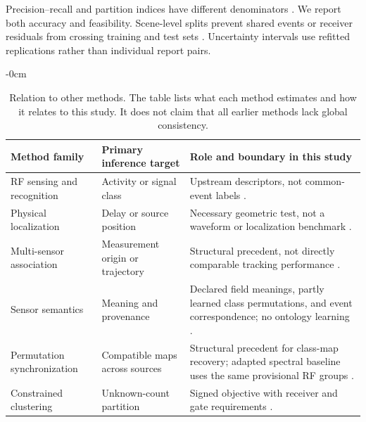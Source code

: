 Precision--recall and partition indices have different denominators \cite{miller2024,hassan2024}. We report both accuracy and feasibility. Scene-level splits prevent shared events or receiver residuals from crossing training and test sets \cite{kapoor}. Uncertainty intervals use refitted replications rather than individual report pairs.
\begin{table}[!t]\begin{adjustwidth}{-\extralength}{0cm}
\caption{Relation to other methods. The table lists what each method estimates and how it relates to this study. It does not claim that all earlier methods lack global consistency.}\label{tab:positioning}
\small\setlength{\tabcolsep}{5pt}\renewcommand{\arraystretch}{1.16}
\begin{tabularx}{\linewidth}{@{}p{3.8cm}p{4.05cm}Y@{}}\toprule
Method family & Primary inference target & Role and boundary in this study\\\midrule
RF sensing and recognition & Activity or signal class & Upstream descriptors, not common-event labels \cite{syed2023,zhang2022amc}.\\
Physical localization & Delay or source position & Necessary geometric test, not a waveform or localization benchmark \cite{knapp,chan,hannotier2024,gur2025}.\\
Multi-sensor association & Measurement origin or trajectory & Structural precedent, not directly comparable tracking performance \cite{cengiz2024,kropfreiter2024,yan2024}.\\
Sensor semantics & Meaning and provenance & Declared field meanings, partly learned class permutations, and event correspondence; no ontology learning \cite{ssn,sosa,prov,emeterio2026}.\\
Permutation synchronization & Compatible maps across sources & Structural precedent for class-map recovery; adapted spectral baseline uses the same provisional RF groups \cite{pachauri2013,chen2014}.\\
Constrained clustering & Unknown-count partition & Signed objective with receiver and gate requirements \cite{bansal,baumann2025}.\\\bottomrule
\end{tabularx}\end{adjustwidth}\end{table}
\FloatBarrier
